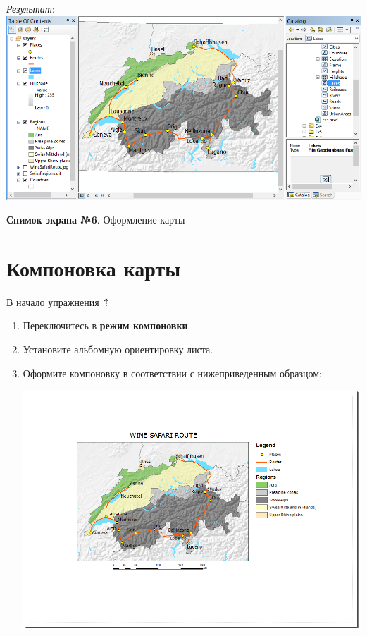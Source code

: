 \documentclass[12pt,]{book}
\begin{document}
\begin{enumerate}
  \emph{Результат}:
  \includegraphics{images/Ex05/image36.png}
\end{enumerate}

\textbf{Снимок экрана №6}. Оформление карты

\hypertarget{map-ref-general-layout}{%
\section{Компоновка карты}\label{map-ref-general-layout}}

\protect\hyperlink{map-ref-general}{В начало упражнения ⇡}

\begin{enumerate}
\def\labelenumi{\arabic{enumi}.}
\item
  Переключитесь в \textbf{режим компоновки}.
\item
  Установите альбомную ориентировку листа.
\item
  Оформите компоновку в соответствии с нижеприведенным образцом:

  \includegraphics{images/Ex05/image37.png}
\end{enumerate}
\end{document}
